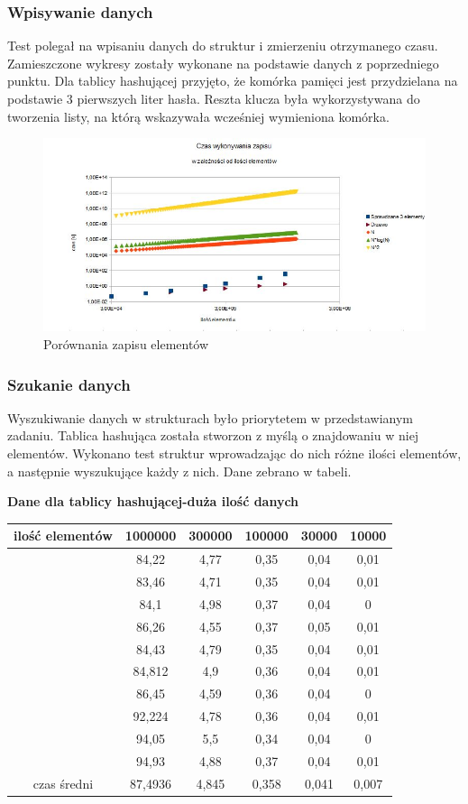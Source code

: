 \documentclass[12pt,a4paper,titlepage]{article}
\begin{document}
\subsubsection{Wpisywanie danych}
Test polegał na wpisaniu danych do struktur i zmierzeniu otrzymanego czasu. Zamieszczone wykresy zostały wykonane na podstawie danych z poprzedniego punktu. Dla tablicy hashującej przyjęto, że komórka pamięci jest przydzielana na podstawie 3 pierwszych liter hasła. Reszta klucza była wykorzystywana do tworzenia listy, na którą wskazywała wcześniej wymieniona komórka.


\begin{figure}[h]
\begin{center}
\includegraphics[scale=0.5]{porownanie_zapisu.jpg}
\caption{Porównania zapisu elementów}
\end{center}
\end{figure}

\subsubsection{Szukanie danych}
Wyszukiwanie danych w strukturach było priorytetem w przedstawianym zadaniu. Tablica hashująca została stworzon z myślą o znajdowaniu w niej elementów. Wykonano test struktur wprowadzając do nich różne ilości elementów, a następnie wyszukujące każdy z nich. Dane zebrano w tabeli.

\begin{center}
\textbf{Dane dla tablicy hashującej-duża ilość danych}
\begin {tabular}{|c|c|c|c|c|c|}\hline
ilość elementów&1000000&300000&100000&30000&10000\\\hline
&84,22&4,77&0,35&0,04&0,01\\\hline
&83,46&4,71&0,35&0,04&0,01\\\hline
&84,1&4,98&0,37&0,04&0\\\hline
&86,26&4,55&0,37&0,05&0,01\\\hline
&84,43&4,79&0,35&0,04&0,01\\\hline
&84,812&4,9&0,36&0,04&0,01\\\hline
&86,45&4,59&0,36&0,04&0\\\hline
&92,224&4,78&0,36&0,04&0,01\\\hline
&94,05&5,5&0,34&0,04&0\\\hline
&94,93&4,88&0,37&0,04&0,01\\\hline
czas średni&87,4936&4,845&0,358&0,041&0,007\\\hline
\end{tabular}
\end {center}
\end{document}
